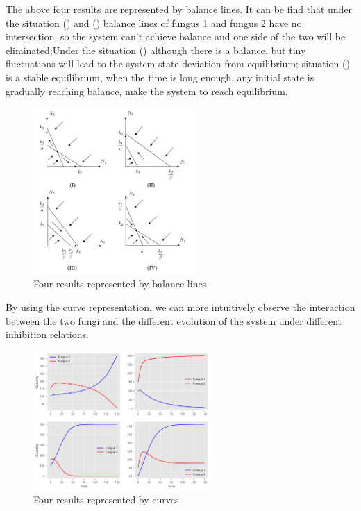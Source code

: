 The above four results are represented by balance lines. It can be find that under the situation (\uppercase\expandafter{}) and (\uppercase\expandafter{}) balance lines of fungus 1 and fungus 2 have no intersection, so the system can't achieve balance and one side of the two will be eliminated;Under the situation (\uppercase\expandafter{}) although there is a balance, but tiny fluctuations will lead to the system state deviation from equilibrium; situation (\uppercase\expandafter{}) is a stable equilibrium, when the time is long enough, any initial state is gradually reaching balance, make the system to reach equilibrium.
    \begin{figure}[H]
        \centering
        \includegraphics[width=0.55\textwidth]{./code/fig6.png}
        \caption{Four results represented by balance lines}\label{fig6}
    \end{figure}
    
By using the curve representation, we can more intuitively observe the interaction between the two fungi and the different evolution of the system under different inhibition relations.
    \begin{figure}[H]
        \centering
        \includegraphics[width=0.6\textwidth]{./code/fig7.jpg}
        \caption{Four results represented by curves}\label{fig7}
    \end{figure}

